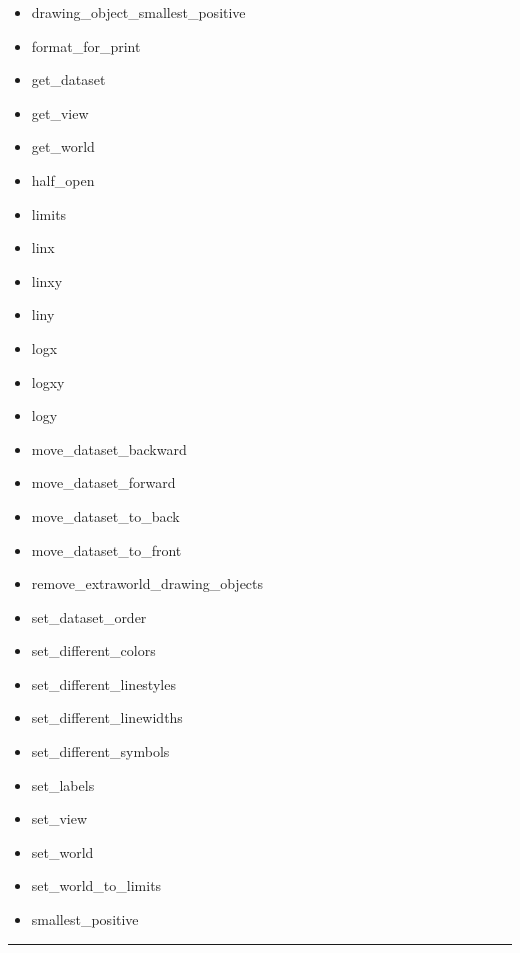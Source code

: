 \documentclass[10pt]{article}
\begin{document}
\begin{multicols}{4}
\begin{itemize}
\begin{itemize}
\item drawing\_object\_smallest\_positive
\item format\_for\_print
\item get\_dataset
\item get\_view
\item get\_world
\item half\_open
\item limits
\item linx
\item linxy
\item liny
\item logx
\item logxy
\item logy
\item move\_dataset\_backward
\item move\_dataset\_forward
\item move\_dataset\_to\_back
\item move\_dataset\_to\_front
\item remove\_extraworld\_drawing\_objects
\item set\_dataset\_order
\item set\_different\_colors
\item set\_different\_linestyles
\item set\_different\_linewidths
\item set\_different\_symbols
\item set\_labels
\item set\_view
\item set\_world
\item set\_world\_to\_limits
\item smallest\_positive
\end{itemize}
\end{itemize}
\vspace{0.5em}
\hrule
\vspace{0.1em}

\end{multicols}
\end{document}

